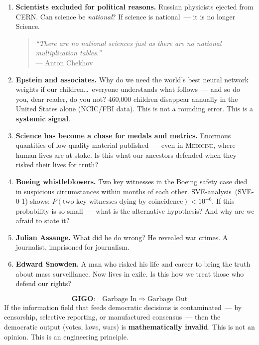 \documentclass[11pt,a4paper]{article}
\theoremstyle{definition}
\theoremstyle{remark}
\begin{document}
\begin{enumerate}[leftmargin=1.5cm, itemsep=6pt]

  \item \textbf{Scientists excluded for political reasons.}
    Russian physicists ejected from CERN.
    Can science be \textit{national}?
    If science is national~--- it is no longer Science.
    \begin{quote}
      \small\textit{``There are no national sciences just as
      there are no national multiplication tables.''}\\
      \hfill --- Anton Chekhov
    \end{quote}

  \item \textbf{Epstein and associates.}
    Why do we need the world's best neural network weights
    if our children\dots\ everyone understands what follows~---
    and so do you, dear reader, do you not?
    460{,}000 children disappear annually in the United States alone
    (NCIC/FBI data). This is not a rounding error.
    This is a \textbf{systemic signal}.

  \item \textbf{Science has become a chase for medals and metrics.}
    Enormous quantities of low-quality material published~---
    even in \textsc{Medicine}, where human lives are at stake.
    Is this what our ancestors defended when they risked their lives
    for truth?

  \item \textbf{Boeing whistleblowers.}
    Two key witnesses in the Boeing safety case died in suspicious
    circumstances within months of each other.
    SVE-analysis~(SVE-0-1) shows:
    $P(\text{two key witnesses dying by coincidence}) < 10^{-6}$.
    If this probability is so small~--- what is the alternative
    hypothesis? And why are we afraid to state it?

  \item \textbf{Julian Assange.}
    What did he do wrong?
    He revealed war crimes.
    A journalist, imprisoned for journalism.

  \item \textbf{Edward Snowden.}
    A man who risked his life and career to bring the truth
    about mass surveillance.
    Now lives in exile.
    Is this how we treat those who defend our rights?

\end{enumerate}

\begin{scibox}
\[
  \textbf{GIGO:}\quad
  \text{Garbage In} \;\Longrightarrow\; \text{Garbage Out}
\]
If the information field that feeds democratic decisions is contaminated~---
by censorship, selective reporting, or manufactured consensus~---
then the democratic output (votes, laws, wars) is
\textbf{mathematically invalid}.
This is not an opinion. This is an engineering principle.
\end{scibox}
\end{document}
